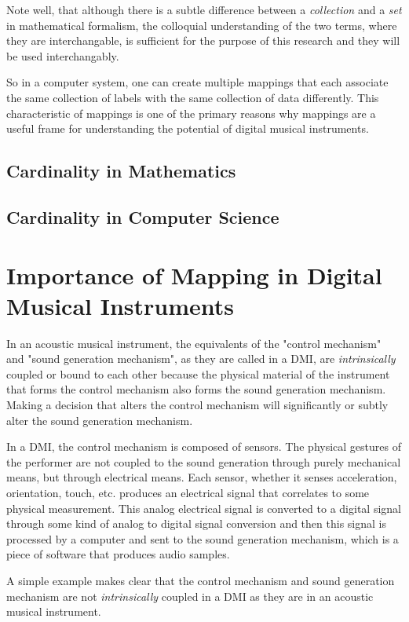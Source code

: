 Note well, that although there is a subtle difference between a \emph{collection} and a \emph{set} in mathematical formalism, the colloquial understanding of the two terms, where they are interchangable, is sufficient for the purpose of this research and they will be used interchangably. 

So in a computer system, one can create multiple mappings that each associate the same collection of labels with the same collection of data differently. This characteristic of mappings is one of the primary reasons why mappings are a useful frame for understanding the potential of digital musical instruments. 

\subsection{Cardinality in Mathematics}

\subsection{Cardinality in Computer Science}

\section{Importance of Mapping in Digital Musical Instruments}

In an acoustic musical instrument, the equivalents of the "control mechanism" and "sound generation mechanism", as they are called in a DMI, are \emph{intrinsically} coupled or bound to each other because the physical material of the instrument that forms the control mechanism also forms the sound generation mechanism. Making a decision that alters the control mechanism will significantly or subtly alter the sound generation mechanism.

In a DMI, the control mechanism is composed of sensors. The physical gestures of the performer are not coupled to the sound generation through purely mechanical means, but through electrical means. Each sensor, whether it senses acceleration, orientation, touch, etc. produces an electrical signal that correlates to some physical measurement. This analog electrical signal is converted to a digital signal through some kind of analog to digital signal conversion and then this signal is processed by a computer and sent to the sound generation mechanism, which is a piece of software that produces audio samples.

A simple example makes clear that the control mechanism and sound generation mechanism are not \emph{intrinsically} coupled in a DMI as they are in an acoustic musical instrument.

